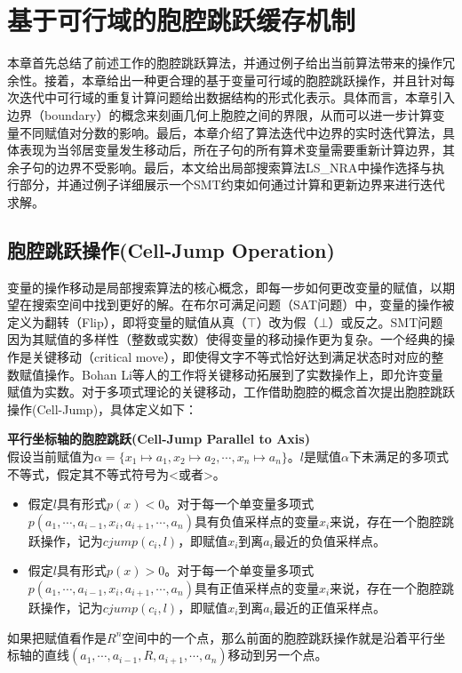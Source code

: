 \chapter{基于可行域的胞腔跳跃缓存机制}\label{chap:method1}
本章首先总结了前述工作的胞腔跳跃算法，并通过例子给出当前算法带来的操作冗余性。接着，本章给出一种更合理的基于变量可行域的胞腔跳跃操作，并且针对每次迭代中可行域的重复计算问题给出数据结构的形式化表示。具体而言，本章引入边界（boundary）的概念来刻画几何上胞腔之间的界限，从而可以进一步计算变量不同赋值对分数的影响。最后，本章介绍了算法迭代中边界的实时迭代算法，具体表现为当邻居变量发生移动后，所在子句的所有算术变量需要重新计算边界，其余子句的边界不受影响。最后，本文给出局部搜索算法LS\_NRA中操作选择与执行部分，并通过例子详细展示一个SMT约束如何通过计算和更新边界来进行迭代求解。

\section{胞腔跳跃操作(Cell-Jump Operation)}
变量的操作移动是局部搜索算法的核心概念，即每一步如何更改变量的赋值，以期望在搜索空间中找到更好的解。在布尔可满足问题（SAT问题）中，变量的操作被定义为翻转（Flip），即将变量的赋值从真（$\top$）改为假（$\bot$）或反之。SMT问题因为其赋值的多样性（整数或实数）使得变量的移动操作更为复杂。一个经典的操作是关键移动（critical move）\cite{CaiLZ22}，即使得文字不等式恰好达到满足状态时对应的整数赋值操作。Bohan Li等人的工作\cite{multilinear}将关键移动拓展到了实数操作上，即允许变量赋值为实数。对于多项式理论的关键移动，工作\cite{LiXZ23}借助胞腔的概念首次提出胞腔跳跃操作(Cell-Jump)，具体定义如下：

\begin{definition}{\textbf{平行坐标轴的胞腔跳跃(Cell-Jump Parallel to Axis)}}\\
假设当前赋值为$\alpha = \{x_1 \mapsto a_1, x_2 \mapsto a_2, \cdots, x_n \mapsto a_n\}$。$l$是赋值$\alpha$下未满足的多项式不等式，假定其不等式符号为<或者>。
\begin{itemize}
    \item 假定$l$具有形式$p(x) < 0$。对于每一个单变量多项式$p(a_1, \cdots, a_{i-1}, x_i, a_{i+1}, \cdots, a_n)$具有负值采样点的变量$x_i$来说，存在一个胞腔跳跃操作，记为$cjump(c_i, l)$，即赋值$x_i$到离$a_i$最近的负值采样点。
    \item 假定$l$具有形式$p(x) > 0$。对于每一个单变量多项式$p(a_1, \cdots, a_{i-1}, x_i, a_{i+1}, \cdots, a_n)$具有正值采样点的变量$x_i$来说，存在一个胞腔跳跃操作，记为$cjump(c_i, l)$，即赋值$x_i$到离$a_i$最近的正值采样点。
\end{itemize}
如果把赋值看作是$R^n$空间中的一个点，那么前面的胞腔跳跃操作就是沿着平行坐标轴的直线$(a_1, \cdots, a_{i-1}, R, a_{i+1}, \cdots, a_n)$移动到另一个点。
\end{definition}

